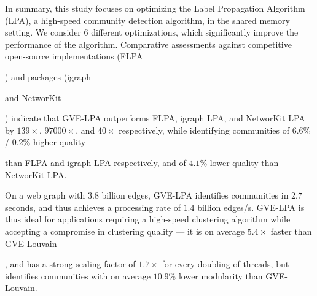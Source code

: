 In summary, this study focuses on optimizing the Label Propagation Algorithm (LPA), a high-speed community detection algorithm, in the shared memory setting. We consider 6 different optimizations, which significantly improve the performance of the algorithm. Comparative assessments against competitive open-source implementations (FLPA) and packages (igraph and NetworKit) indicate that GVE-LPA outperforms FLPA, igraph LPA, and NetworKit LPA by $139\times$, $97000\times$, and $40\times$ respectively, while identifying communities of $6.6\%$ / $0.2\%$ higher quality than FLPA and igraph LPA respectively, and of $4.1\%$ lower quality than NetworKit LPA.

On a web graph with $3.8$ billion edges, GVE-LPA identifies communities in $2.7$ seconds, and thus achieves a processing rate of $1.4$ billion edges/s. GVE-LPA is thus ideal for applications requiring a high-speed clustering algorithm while accepting a compromise in clustering quality --- it is on average $5.4\times$ faster than GVE-Louvain, and has a strong scaling factor of $1.7\times$ for every doubling of threads, but identifies communities with on average $10.9\%$ lower modularity than GVE-Louvain.
